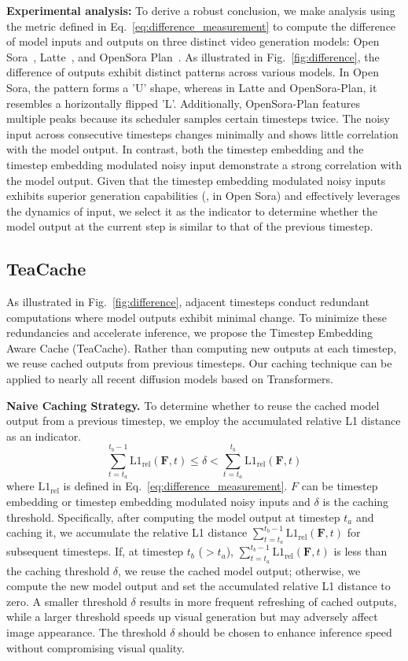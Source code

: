 \textbf{Experimental analysis:}
To derive a robust conclusion, we make analysis using the metric defined in Eq.~\ref{eq:difference_measurement} to compute the difference of model inputs and outputs on three distinct video generation models: Open Sora~\cite{Open-Sora}, Latte~\cite{ma2024latte}, and OpenSora Plan~\cite{Open-Sora-Plan}. As illustrated in Fig.~\ref{fig:difference}, the difference of outputs exhibit distinct patterns across various models. In Open Sora, the pattern forms a 'U' shape, whereas in Latte and OpenSora-Plan, it resembles a horizontally flipped 'L'. Additionally, OpenSora-Plan features multiple peaks because its scheduler samples certain timesteps twice. The noisy input across consecutive timesteps changes minimally and shows little correlation with the model output. In contrast, both the timestep embedding and the timestep embedding modulated noisy input demonstrate a strong correlation with the model output. Given that the timestep embedding modulated noisy inputs exhibits superior generation capabilities (\eg, in Open Sora) and effectively leverages the dynamics of input, we select it as the indicator to determine whether the model output at the current step is similar to that of the previous timestep.


\subsection{TeaCache}
As illustrated in Fig.~\ref{fig:difference}, adjacent timesteps conduct redundant computations where model outputs exhibit minimal change. To minimize these redundancies and accelerate inference, we propose the Timestep Embedding Aware Cache (TeaCache). Rather than computing new outputs at each timestep, we reuse cached outputs from previous timesteps. Our caching technique can be applied to nearly all recent diffusion models based on Transformers.

\textbf{Naive Caching Strategy.} To determine whether to reuse the cached model output from a previous timestep, we employ the accumulated relative L1 distance as an indicator. 
\begin{equation}
\sum_{t=t_a}^{t_b-1} \text{L1}_{\text{rel}}(\mathbf{F}, t) \leq \delta < \sum_{t=t_a}^{t_b} \text{L1}_{\text{rel}}(\mathbf{F}, t)
\end{equation}
where $\text{L1}_{\text{rel}}$ is defined in Eq.~\ref{eq:difference_measurement}. $F$ can be timestep embedding or timestep embedding modulated noisy inputs and $\delta$ is the caching threshold. Specifically, after computing the model output at timestep $t_a$ and caching it, we accumulate the relative L1 distance $\sum_{t=t_a}^{t_b-1} \text{L1}_{\text{rel}}(\mathbf{F}, t)$ for subsequent timesteps. If, at timestep $t_b$ ($>t_a$), $\sum_{t=t_a}^{t_b-1} \text{L1}_{\text{rel}}(\mathbf{F}, t)$ is less than the caching threshold $\delta$, we reuse the cached model output; otherwise, we compute the new model output and set the accumulated relative L1 distance to zero.
A smaller threshold $\delta$ results in more frequent refreshing of cached outputs, while a larger threshold speeds up visual generation but may adversely affect image appearance. The threshold $\delta$ should be chosen to enhance inference speed without compromising visual quality.

